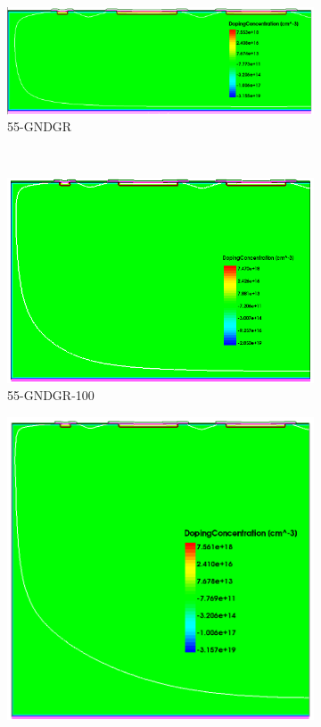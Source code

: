 \begin{figure}[htbp]
\begin{subfigure}[b]{0.5\linewidth}
    \includegraphics[width=\textwidth]{figures/TCAD/dopingConcentration_55_GNDGR.png}
    \caption{55-GNDGR}
  \end{subfigure} \\
  \begin{subfigure}[b]{0.5\linewidth}
    \includegraphics[width=\textwidth]{figures/TCAD/dopingConcentration_55_GNDGR_100.png}
    \caption{55-GNDGR-100}
  \end{subfigure}\hfill
  \begin{subfigure}[b]{0.5\linewidth}
    \includegraphics[width=\textwidth]{figures/TCAD/dopingConcentration_55_GNDGR_150.png}

\end{subfigure}
\end{figure}
